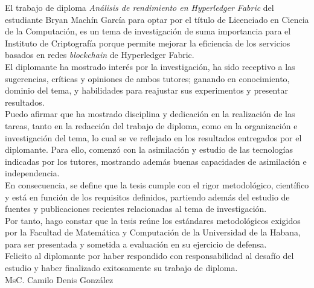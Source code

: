 \begin{opinion}
El trabajo de diploma \emph{An\'alisis de rendimiento en Hyperledger Fabric} del estudiante Bryan Mach\'in Garc\'ia para optar por el t\'itulo de Licenciado en Ciencia de la Computaci\'on, es un tema de investigaci\'on de suma importancia para el Instituto de Criptograf\'ia porque permite mejorar la eficiencia de los servicios basados en redes \emph{blockchain} de Hyperledger Fabric.\\

El diplomante ha mostrado inter\'es por la investigaci\'on, ha sido receptivo a las sugerencias, cr\'iticas y opiniones de ambos tutores; ganando en conocimiento, dominio del tema, y habilidades para reajustar sus experimentos y presentar resultados.\\
 
Puedo afirmar que ha mostrado disciplina y dedicaci\'on en la realizaci\'on de las tareas, tanto en la redacci\'on del trabajo de diploma, como en la organizaci\'on e investigaci\'on del tema, lo cual se ve reflejado en los resultados entregados por el diplomante. Para ello, comenz\'o con la asimilaci\'on y estudio de las tecnolog\'ias indicadas por los tutores, mostrando adem\'as buenas capacidades de asimilaci\'on e independencia.\\

En consecuencia, se define que la tesis cumple con el rigor metodol\'ogico, cient\'ifico y est\'a en funci\'on de los requisitos definidos, partiendo adem\'as del estudio de fuentes y publicaciones recientes relacionadas al tema de investigaci\'on.\\

Por tanto, hago constar que la tesis re\'une los est\'andares metodol\'ogicos exigidos por la Facultad de Matem\'atica y Computaci\'on de la Universidad de la Habana, para ser presentada y sometida a evaluaci\'on en su ejercicio de defensa.\\

Felicito al diplomante por haber respondido con responsabilidad al desaf\'io del estudio y haber finalizado exitosamente su trabajo de diploma.\\

MsC. Camilo Denis González
\end{opinion}